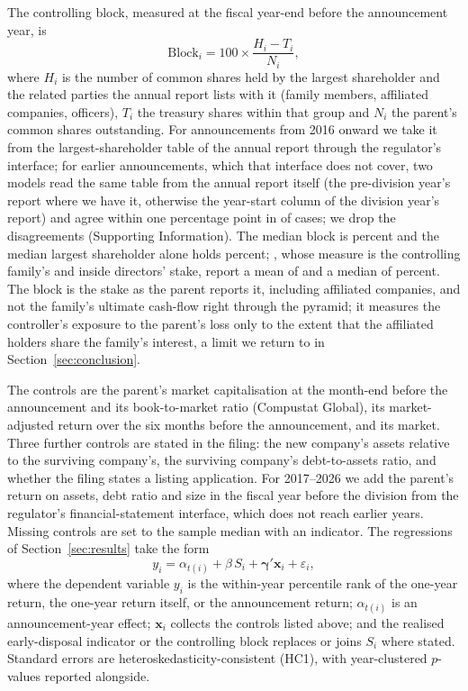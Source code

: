 The controlling block, measured at the fiscal year-end before the announcement year, is
\begin{equation}\label{eq:block}
\mathrm{Block}_i = 100\times\frac{H_i - T_i}{N_i},
\end{equation}
where $H_i$ is the number of common shares held by the largest shareholder and the related parties the annual report lists with it (family members, affiliated companies, officers), $T_i$ the treasury shares within that group and $N_i$ the parent's common shares outstanding. For announcements from 2016 onward we take it from the largest-shareholder table of the annual report through the regulator's interface; for earlier announcements, which that interface does not cover, two models read the same table from the annual report itself (the pre-division year's report where we have it, otherwise the year-start column of the division year's report) and agree within one percentage point in \OwnWithinOne{} of \OwnPairs{} cases; we drop the \OwnDisagree{} disagreements (Supporting Information). The median block is \BlockMedian{} percent and the median largest shareholder alone holds \LargestMedian{} percent; , whose measure is the controlling family's and inside directors' stake, report a mean of \KLOwnMeanOne{} and a median of \KLOwnMedianOne{} percent. The block is the stake as the parent reports it, including affiliated companies, and not the family's ultimate cash-flow right through the pyramid; it measures the controller's exposure to the parent's loss only to the extent that the affiliated holders share the family's interest, a limit we return to in Section~\ref{sec:conclusion}.

The controls are the parent's market capitalisation at the month-end before the announcement and its book-to-market ratio (Compustat Global), its market-adjusted return over the six months before the announcement, and its market. Three further controls are stated in the filing: the new company's assets relative to the surviving company's, the surviving company's debt-to-assets ratio, and whether the filing states a listing application. For 2017--2026 we add the parent's return on assets, debt ratio and size in the fiscal year before the division from the regulator's financial-statement interface, which does not reach earlier years. Missing controls are set to the sample median with an indicator. The regressions of Section~\ref{sec:results} take the form
\begin{equation}\label{eq:main}
y_i = \alpha_{t(i)} + \beta\, S_i + \boldsymbol{\gamma}'\mathbf{x}_i + \varepsilon_i,
\end{equation}
where the dependent variable $y_i$ is the within-year percentile rank of the one-year return, the one-year return itself, or the announcement return; $\alpha_{t(i)}$ is an announcement-year effect; $\mathbf{x}_i$ collects the controls listed above; and the realised early-disposal indicator or the controlling block replaces or joins $S_i$ where stated. Standard errors are heteroskedasticity-consistent (HC1), with year-clustered $p$-values reported alongside.
